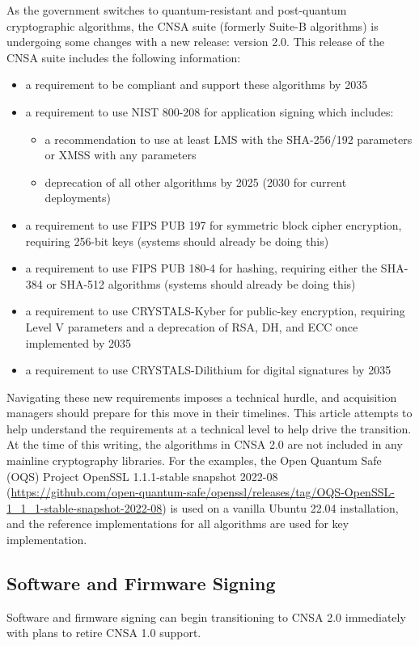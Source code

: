 As the government switches to quantum-resistant and post-quantum cryptographic algorithms, the CNSA suite (formerly Suite-B algorithms) is undergoing some changes with a new release: version 2.0. This release of the CNSA suite includes the following information:\autocite{20220919:cnsa}
\begin{itemize}
	\item a requirement to be compliant and support these algorithms by 2035
	\item a requirement to use NIST 800-208 for application signing which includes:
	\begin{itemize}
		\item a recommendation to use at least LMS with the SHA-256/192 parameters or XMSS with any parameters
		\item deprecation of all other algorithms by 2025 (2030 for current deployments)
	\end{itemize}
	\item a requirement to use FIPS PUB 197 for symmetric block cipher encryption, requiring 256-bit keys (systems should already be doing this)
	\item a requirement to use FIPS PUB 180-4 for hashing, requiring either the SHA-384 or SHA-512 algorithms (systems should already be doing this)
	\item a requirement to use CRYSTALS-Kyber for public-key encryption, requiring Level V parameters and a deprecation of RSA, DH, and ECC once implemented by 2035
	\item a requirement to use CRYSTALS-Dilithium for digital signatures by 2035
\end{itemize}

Navigating these new requirements imposes a technical hurdle, and acquisition managers should prepare for this move in their timelines. This article attempts to help understand the requirements at a technical level to help drive the transition. At the time of this writing, the algorithms in CNSA 2.0 are not included in any mainline cryptography libraries. For the examples, the Open Quantum Safe (OQS) Project OpenSSL 1.1.1-stable snapshot 2022-08 (\url{https://github.com/open-quantum-safe/openssl/releases/tag/OQS-OpenSSL-1_1_1-stable-snapshot-2022-08}) is used on a vanilla Ubuntu 22.04 installation, and the reference implementations for all algorithms are used for key implementation.

\subsection{Software and Firmware Signing}
Software and firmware signing can begin transitioning to CNSA 2.0 immediately with plans to retire CNSA 1.0 support.

